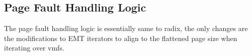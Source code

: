 \subsection{Page Fault Handling Logic}

The page fault handling logic is essentially same to radix, the only changes are the modifications to EMT iterators to align to the flattened page size when iterating over vmfs.